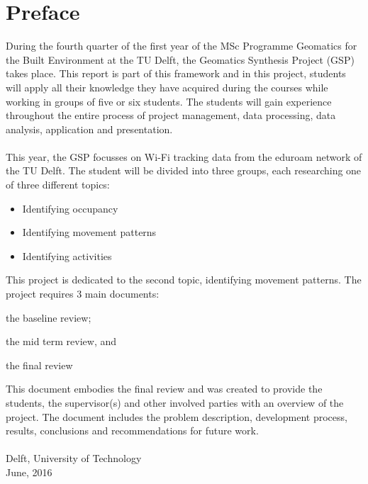 \chapter{Preface}

During the fourth quarter of the first year of the MSc Programme Geomatics for the Built Environment at the TU Delft, the Geomatics Synthesis Project (GSP) takes place. This report is part of this framework and in this project, students will apply all their knowledge they have acquired during the courses while working in groups of five or six students. The students will gain experience throughout the entire process of project management, data processing, data analysis, application and presentation. \\\\
This year, the GSP focusses on Wi-Fi tracking data from the eduroam network of the TU Delft. The student will be divided into three groups, each researching one of three different topics:
\begin{itemize}
\item Identifying occupancy
\item Identifying movement patterns
\item Identifying activities
\end{itemize}
This project is dedicated to the second topic, identifying movement patterns. The project requires 3 main documents: \begin {enumerate*} [label=\itshape\arabic*\upshape),font={\color{red!0!black}\bfseries}] \item the baseline review; \item the mid term review, and \item the final review
\end{enumerate*}
This document embodies the final review and was created to provide the students, the supervisor(s) and other involved parties with an overview of the project. The document includes the problem description, development process, results, conclusions and recommendations for future work.
\\\\
Delft, University of Technology\\
June, 2016
